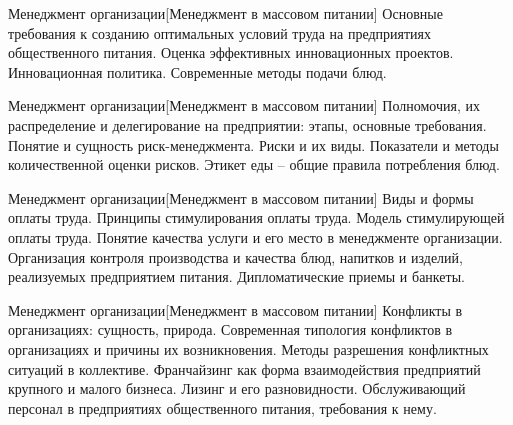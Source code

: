 \documentclass[
	11pt,
	a4paper,
	]
	{article}
\begin{document}
\begin{minipage}[t][\miniH]{\miniL}\centering
	 {Менеджмент организации}[Менеджмент в массовом питании]
		{
			Основные требования к созданию оптимальных условий труда на предприятиях общественного питания.
		}{
			Оценка эффективных инновационных проектов. Инновационная политика.
		}{
			Современные методы подачи блюд.
		}
	\lowGE
\end{minipage}

\vfill



\begin{minipage}[t][\miniH]{\miniL}\centering
	 {Менеджмент организации}[Менеджмент в массовом питании]
		{
			Полномочия, их распределение и делегирование на предприятии: этапы, основные требования.
		}{
			Понятие и сущность риск-менеджмента. Риски и их виды. Показатели и методы количественной оценки рисков.
		}{
			Этикет еды – общие правила потребления блюд.
		}
	\lowGE
\end{minipage}

\vfill



\begin{minipage}[t][\miniH]{\miniL}\centering
	 {Менеджмент организации}[Менеджмент в массовом питании]
		{
			Виды и формы оплаты труда. Принципы стимулирования оплаты труда. Модель стимулирующей оплаты труда.
		}{
			Понятие качества услуги и его место в менеджменте организации. Организация контроля производства и качества блюд, напитков и изделий, реализуемых предприятием питания.
		}{
			Дипломатические приемы и банкеты.
		}
	\lowGE
\end{minipage}





\begin{minipage}[t][\miniH]{\miniL}\centering
	 {Менеджмент организации}[Менеджмент в массовом питании]
		{
			Конфликты в организациях: сущность, природа. Современная типология конфликтов в организациях и причины их возникновения. Методы разрешения конфликтных ситуаций в коллективе.
		}{
			Франчайзинг как форма взаимодействия предприятий крупного и малого бизнеса. Лизинг и его разновидности.
		}{
			Обслуживающий персонал в предприятиях общественного питания, требования к нему.
		}
	\lowGE
\end{minipage}

\vfill
\end{document}
